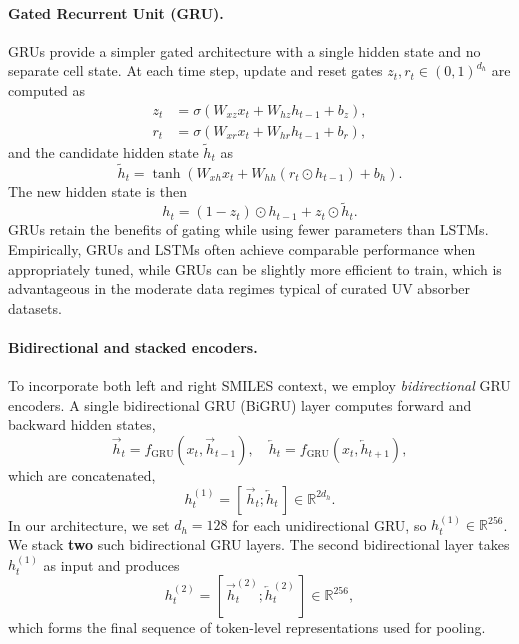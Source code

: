\documentclass[11pt,a4paper]{article}
\begin{document}
\paragraph{Gated Recurrent Unit (GRU).}
GRUs provide a simpler gated architecture with a single hidden state and no separate cell state. At each time step, update and reset gates $z_t, r_t \in (0,1)^{d_h}$ are computed as
\begin{align}
  z_t &= \sigma(W_{xz} x_t + W_{hz} h_{t-1} + b_z), \\
  r_t &= \sigma(W_{xr} x_t + W_{hr} h_{t-1} + b_r),
\end{align}
and the candidate hidden state $\tilde{h}_t$ as
\begin{equation}
  \tilde{h}_t = \tanh \left( W_{xh} x_t + W_{hh} (r_t \odot h_{t-1}) + b_h \right).
\end{equation}
The new hidden state is then
\begin{equation}
  h_t = (1 - z_t) \odot h_{t-1} + z_t \odot \tilde{h}_t.
\end{equation}
GRUs retain the benefits of gating while using fewer parameters than LSTMs. Empirically, GRUs and LSTMs often achieve comparable performance when appropriately tuned, while GRUs can be slightly more efficient to train, which is advantageous in the moderate data regimes typical of curated UV absorber datasets.

\paragraph{Bidirectional and stacked encoders.}
To incorporate both left and right SMILES context, we employ \emph{bidirectional} GRU encoders. A single bidirectional GRU (BiGRU) layer computes forward and backward hidden states,
\begin{equation}
  \overrightarrow{h}_t = f_{\mathrm{GRU}}(x_t, \overrightarrow{h}_{t-1}), \quad
  \overleftarrow{h}_t = f_{\mathrm{GRU}}(x_t, \overleftarrow{h}_{t+1}),
\end{equation}
which are concatenated,
\begin{equation}
  h_t^{(1)} = [\,\overrightarrow{h}_t; \overleftarrow{h}_t\,] \in \mathbb{R}^{2d_h}.
\end{equation}
In our architecture, we set $d_h = 128$ for each unidirectional GRU, so $h_t^{(1)} \in \mathbb{R}^{256}$. We stack \textbf{two} such bidirectional GRU layers. The second bidirectional layer takes $h_t^{(1)}$ as input and produces
\begin{equation}
  h_t^{(2)} = [\,\overrightarrow{h}_t^{(2)}; \overleftarrow{h}_t^{(2)}\,] \in \mathbb{R}^{256},
\end{equation}
which forms the final sequence of token-level representations used for pooling.
\end{document}
